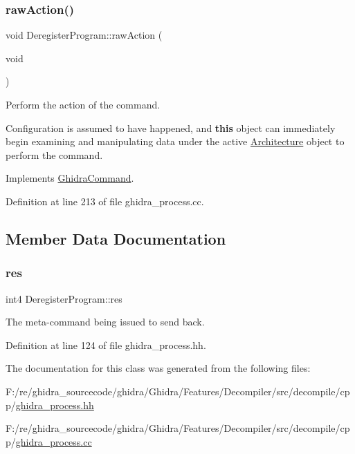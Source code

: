 \subsubsection{\texorpdfstring{rawAction()}{rawAction()}}
{\footnotesize\ttfamily void Deregister\+Program\+::raw\+Action (\begin{DoxyParamCaption}\item[{void}]{ }\end{DoxyParamCaption})\hspace{0.3cm}{\ttfamily [virtual]}}



Perform the action of the command. 

Configuration is assumed to have happened, and {\bfseries{this}} object can immediately begin examining and manipulating data under the active \mbox{\hyperlink{class_architecture}{Architecture}} object to perform the command. 

Implements \mbox{\hyperlink{class_ghidra_command_a7d1a5cfedfd8f1d05161d27627302716}{Ghidra\+Command}}.



Definition at line 213 of file ghidra\+\_\+process.\+cc.



\subsection{Member Data Documentation}
\mbox{\label{class_deregister_program_a16f594587cf7aca26cfd85143cba8c05}} 
\subsubsection{\texorpdfstring{res}{res}}
{\footnotesize\ttfamily int4 Deregister\+Program\+::res}



The meta-\/command being issued to send back. 



Definition at line 124 of file ghidra\+\_\+process.\+hh.



The documentation for this class was generated from the following files\+:\begin{DoxyCompactItemize}
\item 
F\+:/re/ghidra\+\_\+sourcecode/ghidra/\+Ghidra/\+Features/\+Decompiler/src/decompile/cpp/\mbox{\hyperlink{ghidra__process_8hh}{ghidra\+\_\+process.\+hh}}\item 
F\+:/re/ghidra\+\_\+sourcecode/ghidra/\+Ghidra/\+Features/\+Decompiler/src/decompile/cpp/\mbox{\hyperlink{ghidra__process_8cc}{ghidra\+\_\+process.\+cc}}\end{DoxyCompactItemize}

